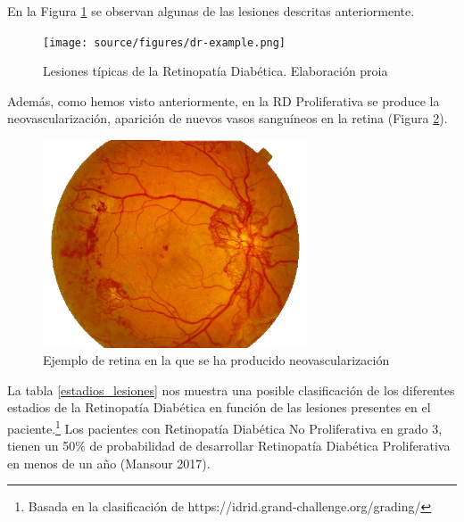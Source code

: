 \documentclass[
  12pt,
  spanish,
  a4paperpaper,
]{report}
\begin{document}
En la Figura \ref{lesiones} se observan algunas de las lesiones
descritas anteriormente.

\begin{figure}
\centering
\texttt{[image: source/figures/dr-example.png]}
\caption{Lesiones típicas de la Retinopatía Diabética. Elaboración proia
\label{lesiones}}
\end{figure}

Además, como hemos visto anteriormente, en la RD Proliferativa se
produce la neovascularización, aparición de nuevos vasos sanguíneos en
la retina (Figura \ref{vascular}).

\begin{figure}
\centering
\includegraphics[width=0.7\textwidth,height=\textheight]{source/figures/vascular.png}
\caption{Ejemplo de retina en la que se ha producido neovascularización
\label{vascular}}
\end{figure}

La tabla \ref{estadios_lesiones} nos muestra una posible clasificación
de los diferentes estadios de la Retinopatía Diabética en función de las
lesiones presentes en el paciente.\footnote{Basada en la clasificación
  de https://idrid.grand-challenge.org/grading/} Los pacientes con
Retinopatía Diabética No Proliferativa en grado 3, tienen un 50\% de
probabilidad de desarrollar Retinopatía Diabética Proliferativa en menos
de un año (Mansour 2017).
\end{document}
